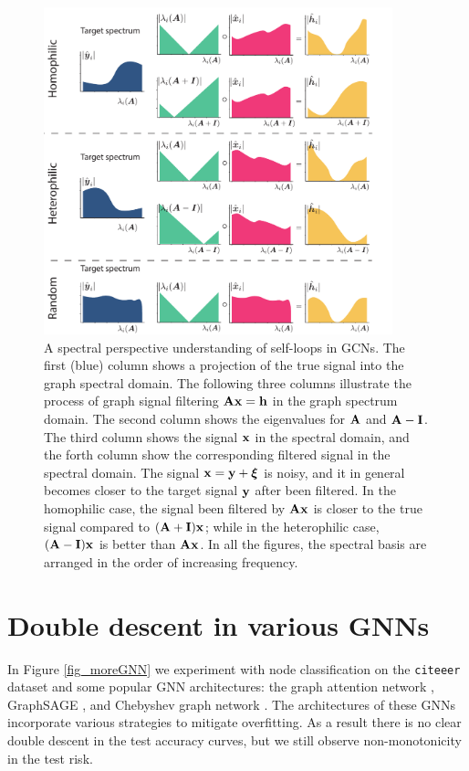 \documentclass[9pt,twocolumn]{pnas-new}
\begin{document}
\begin{figure}[h!]
    \centering
    \includegraphics[width=0.9\textwidth]{fig/selfloop_ill.pdf}
    \caption{A spectral perspective understanding of self-loops in GCNs. The first (blue) column shows a projection of the true signal into the graph spectral domain. The following three columns illustrate the process of graph signal filtering $\mathbf{A}\mathbf{x}=\mathbf{h}$ in the graph spectrum domain. The second column shows the eigenvalues for $\mathbf{A}$ and $\mathbf{A}-\mathbf{I}$. The third column shows the signal $\mathbf{x}$ in the spectral domain, and the forth column show the corresponding filtered signal in the spectral domain. The signal $\mathbf{x}=\mathbf{y}+\boldsymbol{\xi}$ is noisy, and it in general becomes closer to the target signal $\mathbf{y}$ after been filtered. In the homophilic case, the signal been filtered by $\mathbf{A}\mathbf{x}$ is closer to the true signal compared to $(\mathbf{A}+\mathbf{I})\mathbf{x}$; while in the heterophilic case, $(\mathbf{A}-\mathbf{I})\mathbf{x}$ is better than $\mathbf{A}\mathbf{x}$. In all the figures, the spectral basis are arranged in the order of increasing frequency. }
    \label{fig:selfloop_ills}
\end{figure}


\section{Double descent in various GNNs}\label{APP: moreGCN}

In Figure \ref{fig_moreGNN} we experiment with node classification on the \texttt{citeeer} dataset and some popular GNN architectures: the graph attention network \cite{velivckovic2017graph}, GraphSAGE \cite{hamilton2017inductive}, and Chebyshev graph network \cite{defferrard2016convolutional}. The architectures of these GNNs incorporate various strategies to mitigate overfitting. As a result there is no clear double descent in the test accuracy curves, but we still observe  non-monotonicity in the test risk.
\end{document}
